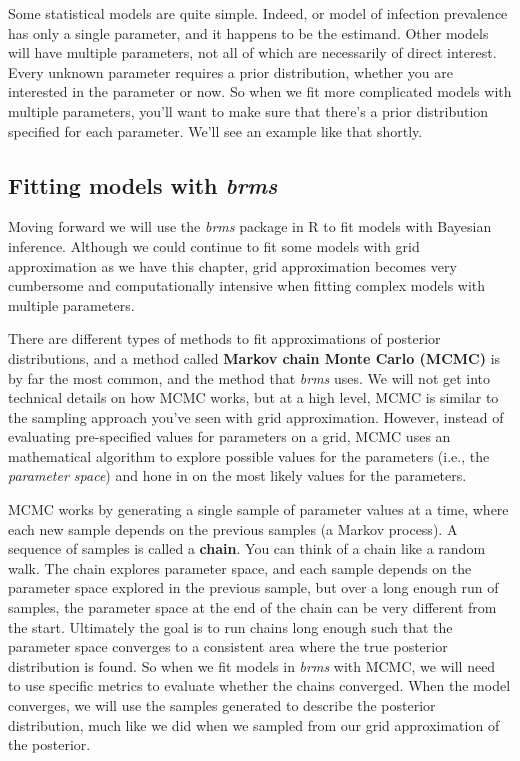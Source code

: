 \documentclass[
]{book}
\begin{document}
Some statistical models are quite simple. Indeed, or model of infection
prevalence has only a single parameter, and it happens to be the
estimand. Other models will have multiple parameters, not all of which
are necessarily of direct interest. Every unknown parameter requires a
prior distribution, whether you are interested in the parameter or now.
So when we fit more complicated models with multiple parameters, you'll
want to make sure that there's a prior distribution specified for each
parameter. We'll see an example like that shortly.

\subsection{\texorpdfstring{Fitting models with \emph{brms}}{Fitting models with brms}}\label{fitting-models-with-brms}

Moving forward we will use the \emph{brms} package in R to fit models with
Bayesian inference. Although we could continue to fit some models with
grid approximation as we have this chapter, grid approximation becomes
very cumbersome and computationally intensive when fitting complex
models with multiple parameters.

There are different types of methods to fit approximations of posterior
distributions, and a method called \textbf{Markov chain Monte Carlo (MCMC)}
is by far the most common, and the method that \emph{brms} uses. We will not
get into technical details on how MCMC works, but at a high level, MCMC
is similar to the sampling approach you've seen with grid approximation.
However, instead of evaluating pre-specified values for parameters on a
grid, MCMC uses an mathematical algorithm to explore possible values for
the parameters (i.e., the \emph{parameter space}) and hone in on the most
likely values for the parameters.

MCMC works by generating a single sample of parameter values at a time,
where each new sample depends on the previous samples (a Markov
process). A sequence of samples is called a \textbf{chain}. You can think of
a chain like a random walk. The chain explores parameter space, and each
sample depends on the parameter space explored in the previous sample,
but over a long enough run of samples, the parameter space at the end of
the chain can be very different from the start. Ultimately the goal is
to run chains long enough such that the parameter space converges to a
consistent area where the true posterior distribution is found. So when
we fit models in \emph{brms} with MCMC, we will need to use specific metrics
to evaluate whether the chains converged. When the model converges, we
will use the samples generated to describe the posterior distribution,
much like we did when we sampled from our grid approximation of the
posterior.
\end{document}
